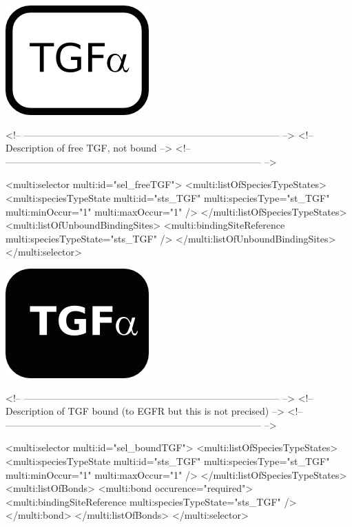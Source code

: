 \includegraphics{figs/pngs/sel_freeTGF.png}

\begin{example}
<!-- -------------------------------------------------------------------------------- -->
<!-- Description of free TGF, not bound                                               -->
<!-- -------------------------------------------------------------------------------- -->

      <multi:selector multi:id="sel_freeTGF">
        <multi:listOfSpeciesTypeStates>
          <multi:speciesTypeState multi:id="sts_TGF" multi:speciesType="st_TGF" 
                                   multi:minOccur="1" multi:maxOccur="1" />
        </multi:listOfSpeciesTypeStates>
        <multi:listOfUnboundBindingSites>
          <multi:bindingSiteReference multi:speciesTypeState="sts_TGF" />
        </multi:listOfUnboundBindingSites>
      </multi:selector>
\end{example}

\includegraphics{figs/pngs/sel_boundTGF.png}

\begin{example}
<!-- -------------------------------------------------------------------------------- -->
<!-- Description of TGF bound (to EGFR but this is not precised)                      -->
<!-- -------------------------------------------------------------------------------- -->

      <multi:selector multi:id="sel_boundTGF">
        <multi:listOfSpeciesTypeStates>
          <multi:speciesTypeState multi:id="sts_TGF" multi:speciesType="st_TGF" 
                                   multi:minOccur="1" multi:maxOccur="1" />
        </multi:listOfSpeciesTypeStates>
        <multi:listOfBonds>
          <multi:bond occurence="required">
            <multi:bindingSiteReference multi:speciesTypeState="sts_TGF" />
          </multi:bond>
        </multi:listOfBonds>
      </multi:selector>
\end{example}

